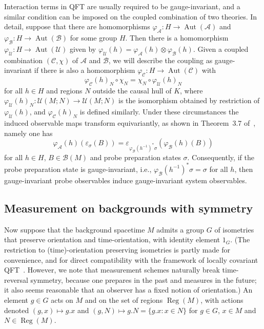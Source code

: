 \documentclass[sn-mathphys-num]{sn-jnl}%
\newcommand{\Af}{\mathscr{A}}
\newcommand{\Bf}{\mathscr{B}}
\newcommand{\Cf}{\mathscr{C}}
\newcommand{\Uf}{\mathscr{U}}
\DeclareMathOperator{\Aut}{Aut}
\DeclareMathOperator{\Reg}{Reg}
\numberwithin{equation}{section}
\theoremstyle{thmstyleone}%
\theoremstyle{thmstyletwo}%
\theoremstyle{thmstylethree}%
\begin{document}
Interaction terms in QFT are usually required to be gauge-invariant, and a similar condition can be imposed on the coupled combination of two theories. In detail, suppose that there are homomorphisms $\varphi_\Af:H\to\Aut(\Af)$ and $\varphi_\Bf:H\to\Aut(\Bf)$ for some group $H$. Then there is a homomorphism
$\varphi_\Uf:H\to\Aut(\Uf)$ given by $\varphi_\Uf(h)=\varphi_\Af(h)\otimes\varphi_\Bf(h)$. Given a coupled combination $(\Cf,\chi)$ of $\Af$ and $\Bf$, we will describe the coupling as gauge-invariant if there is also a homomorphism $\varphi_\Cf:H\to \Aut(\Cf)$ with 
\begin{equation}\label{eq:CfUf}
    \varphi_\Cf(h)_N\circ\chi_N=\chi_N\circ\varphi_\Uf(h)_N
\end{equation} 
for all $h\in H$ and regions $N$ outside the causal hull of $K$,
where $\varphi_\Uf(h)_N:\Uf(M;N)\to\Uf(M;N)$ is the isomorphism
obtained by restriction of $\varphi_\Uf(h)$, and $\varphi_\Cf(h)_N$ is defined similarly. 
Under these circumstances the induced observable maps transform equivariantly, as shown in Theorem~3.7 of~\cite{FewVer_QFLM:2018}, namely one has
\begin{equation}
    \varphi_\Af(h)(\varepsilon_\sigma(B)) = \varepsilon_{\varphi_\Bf(h^{-1})^*\sigma} (\varphi_\Bf(h)(B))
\end{equation}
for all $h\in H$, $B\in\Bf(M)$ and probe preparation states $\sigma$. Consequently, if the probe preparation state is gauge-invariant, i.e., $\varphi_\Bf(h^{-1})^*\sigma=\sigma$ for all $h$, then gauge-invariant probe observables induce gauge-invariant system observables. 

\subsection{Measurement on backgrounds with symmetry} \label{sec: measurement with symm}


Now suppose that the background spacetime $M$ admits a group $G$ of isometries that preserve orientation and time-orientation,  
with identity element $1_G$. (The restriction to (time)-orientation preserving isometries is partly made for convenience, and for direct compatibility with the framework of locally covariant QFT~\cite{BrFrVe03}. However, we note that measurement schemes naturally break time-reversal symmetry, because one prepares in the past and measures in the future; it also seems reasonable that an observer has a fixed notion of orientation.) An element $g\in G$ acts on $M$ and on the set of regions $\Reg(M)$, with actions denoted $(g,x)\mapsto g.x$ and $(g,N)\mapsto g.N = \{g.x:x\in N\}$ for $g\in G$, $x\in M$ and $N\in\Reg(M)$. 
\end{document}
